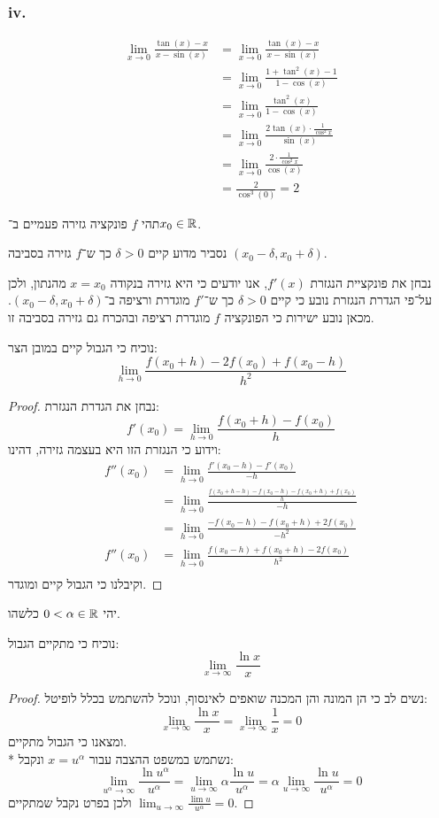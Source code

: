 \subsubsection{iv.}
\begin{align*}
	\lim_{x \to 0} \frac{\tan(x) - x}{x - \sin(x)}
	& = \lim_{x \to 0} \frac{\tan(x) - x}{x - \sin(x)} \\
	& = \lim_{x \to 0} \frac{1 + \tan^2(x) - 1}{1 - \cos(x)} \\
	& = \lim_{x \to 0} \frac{\tan^2(x)}{1 - \cos(x)} \\
	& = \lim_{x \to 0} \frac{2 \tan(x) \cdot \frac{1}{\cos^2 x}}{\sin(x)} \\
	& = \lim_{x \to 0} \frac{2 \cdot \frac{1}{\cos^2 x}}{\cos(x)} \\
	& = \frac{2}{\cos^3(0)} 
	= 2
\end{align*}

\Question{}
תהי $f$ פונקציה גזירה פעמיים ב־$x_0 \in \mathbb{R}$.

\Subquestion{}
נסביר מדוע קיים $\delta > 0$ כך ש־$f$ גזירה בסביבה $(x_0 - \delta, x_0 + \delta)$.

נבחן את פונקציית הנגזרת $f'(x)$, אנו יודעים כי היא גזירה בנקודה $x = x_0$ מהנתון, ולכן על־פי הגדרת הנגזרת נובע כי קיים $\delta > 0$ כך ש־$f'$ מוגדרת ורציפה ב־$(x_0 - \delta, x_0 + \delta)$.
מכאן נובע ישירות כי הפונקציה $f$ מוגדרת רציפה ובהכרח גם גזירה בסביבה זו.

\Subquestion{}
נוכיח כי הגבול קיים במובן הצר:
\[
	\lim_{h \to 0} \frac{f(x_0 + h) - 2f(x_0) + f(x_0 - h)}{h^2}
\]
\begin{proof}
	נבחן את הגדרת הנגזרת:
	\[
		f'(x_0) = \lim_{h \to 0} \frac{f(x_0 + h) - f(x_0)}{h}
	\]
	וידוע כי הנגזרת הזו היא בעצמה גזירה, דהינו:
	\begin{align*}
		f''(x_0)
		& = \lim_{h \to 0} \frac{f'(x_0 - h) - f'(x_0)}{-h} \\
		& = \lim_{h \to 0} \frac{\frac{f(x_0 + h - h) - f(x_0 - h) - f(x_0 + h) + f(x_0)}{h}}{-h} \\
		& = \lim_{h \to 0} \frac{-f(x_0 - h) - f(x_0 + h) + 2f(x_0)}{-h^2} \\
		f''(x_0) & = \lim_{h \to 0} \frac{f(x_0 - h) + f(x_0 + h) - 2f(x_0)}{h^2} \\
	\end{align*}
	וקיבלנו כי הגבול קיים ומוגדר.
\end{proof}

\Question{}
יהי $0 < \alpha \in \mathbb{R}$ כלשהו.

\Subquestion{}
נוכיח כי מתקיים הגבול:
\[
	\lim_{x \to \infty} \frac{\ln x}{x}
\]
\begin{proof}
	נשים לב כי הן המונה והן המכנה שואפים לאינסוף, ונוכל להשתמש בכלל לופיטל:
	\[
		\lim_{x \to \infty} \frac{\ln x}{x}
		= \lim_{x \to \infty} \frac{1}{x}
		= 0
	\]
	ומצאנו כי הגבול מתקיים. \\*
	נשתמש במשפט ההצבה עבור $x = u^\alpha$ ונקבל:
	\[
		\lim_{u^\alpha \to \infty} \frac{\ln u^\alpha}{u^\alpha}
		= \lim_{u \to \infty} \alpha \frac{\ln u}{u^\alpha}
		= \alpha \lim_{u \to \infty} \frac{\ln u}{u^\alpha}
		= 0
	\]
	ולכן בפרט נקבל שמתקיים $\lim_{u \to \infty} \frac{\lim u}{u^\alpha} = 0$.
\end{proof}

